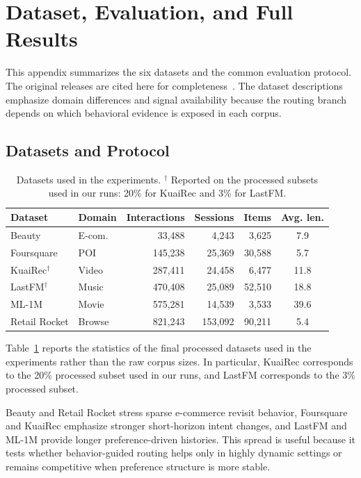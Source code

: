 \documentclass[sigconf,review,anonymous]{acmart}
\begin{document}
\section{Dataset, Evaluation, and Full Results}
\label{app:data-details}
This appendix summarizes the six datasets and the common evaluation protocol. The original releases are cited here for completeness~\cite{mcauley2015amazon,yang2010foursquare,gao2022kuairec,celma2010music,harper2015movielens,retailrocket2015dataset}. The dataset descriptions emphasize domain differences and signal availability because the routing branch depends on which behavioral evidence is exposed in each corpus.

\subsection{Datasets and Protocol}

\begin{table}[t]
  \centering
  \footnotesize
  \setlength{\tabcolsep}{3.0pt}
  \begin{tabular*}{\columnwidth}{@{\extracolsep{\fill}}llrrrc@{}}
    \toprule
    Dataset & Domain & Interactions & Sessions & Items & Avg. len. \\
    \midrule
    Beauty & E-com. & 33,488 & 4,243 & 3,625 & 7.9 \\
    Foursquare & POI & 145,238 & 25,369 & 30,588 & 5.7 \\
    KuaiRec$^{\dagger}$ & Video & 287,411 & 24,458 & 6,477 & 11.8 \\
    LastFM$^{\dagger}$ & Music & 470,408 & 25,089 & 52,510 & 18.8 \\
    ML-1M & Movie & 575,281 & 14,539 & 3,533 & 39.6 \\
    Retail Rocket & Browse & 821,243 & 153,092 & 90,211 & 5.4 \\
    \bottomrule
  \end{tabular*}
  \caption{Datasets used in the experiments. $^{\dagger}$ Reported on the processed subsets used in our runs: 20\% for KuaiRec and 3\% for LastFM.}
  \label{tab:appendix-datasets}
\end{table}

Table~\ref{tab:appendix-datasets} reports the statistics of the final processed datasets used in the experiments rather than the raw corpus sizes. In particular, KuaiRec corresponds to the 20\% processed subset used in our runs, and LastFM corresponds to the 3\% processed subset.

Beauty and Retail Rocket stress sparse e-commerce revisit behavior, Foursquare and KuaiRec emphasize stronger short-horizon intent changes, and LastFM and ML-1M provide longer preference-driven histories. This spread is useful because it tests whether behavior-guided routing helps only in highly dynamic settings or remains competitive when preference structure is more stable.
\end{document}
